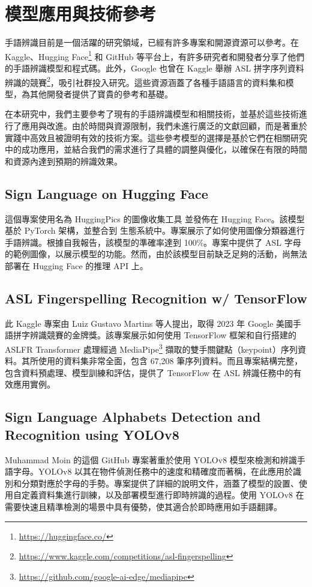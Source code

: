 \documentclass[conference]{IEEEtran}
\begin{document}
\section{模型應用與技術參考}

手語辨識目前是一個活躍的研究領域，已經有許多專案和開源資源可以參考。在 Kaggle、Hugging Face\footnote{\url{https://huggingface.co/}} 和 GitHub 等平台上，有許多研究者和開發者分享了他們的手語辨識模型和程式碼。此外，Google 也曾在 Kaggle 舉辦 ASL 拼字序列資料辨識的競賽\footnote{\url{https://www.kaggle.com/competitions/asl-fingerspelling}}，吸引社群投入研究。這些資源涵蓋了各種手語語言的資料集和模型，為其他開發者提供了寶貴的參考和基礎。

在本研究中，我們主要參考了現有的手語辨識模型和相關技術，並基於這些技術進行了應用與改進。由於時間與資源限制，我們未進行廣泛的文獻回顧，而是著重於實踐中高效且被證明有效的技術方案。這些參考模型的選擇是基於它們在相關研究中的成功應用，並結合我們的需求進行了具體的調整與優化，以確保在有限的時間和資源內達到預期的辨識效果。

\subsection{Sign Language on Hugging Face}
這個專案使用名為 HuggingPics 的圖像收集工具 \cite{ravenonur2024sign, nate2021hugging} 並發佈在 Hugging Face。該模型基於 PyTorch 架構，並整合到  生態系統中。專案展示了如何使用圖像分類器進行手語辨識。根據自我報告，該模型的準確率達到 100\%。專案中提供了 ASL 字母的範例圖像，以展示模型的功能。然而，由於該模型目前缺乏足夠的活動，尚無法部署在 Hugging Face 的推理 API 上。

\subsection{ASL Fingerspelling Recognition w/ TensorFlow}
此 Kaggle 專案由 Luiz Gustavo Martins 等人提出，取得 2023 年 Google 美國手語拼字辨識競賽的金牌獎。該專案展示如何使用 TensorFlow 框架和自行搭建的 ASLFR Transformer 處理經過 MediaPipe\footnote{\url{https://github.com/google-ai-edge/mediapipe}} 擷取的雙手關鍵點（keypoint）序列資料\cite{gusthema2024asl}。其所使用的資料集非常全面，包含 67,208 筆序列資料。而且專案結構完整，包含資料預處理、模型訓練和評估，提供了 TensorFlow 在 ASL 辨識任務中的有效應用實例。

\subsection{Sign Language Alphabets Detection and Recognition using YOLOv8}
Muhammad Moin 的這個 GitHub 專案著重於使用 YOLOv8 模型來檢測和辨識手語字母\cite{muhammadmoinfaisal2024sign}。YOLOv8 以其在物件偵測任務中的速度和精確度而著稱，在此應用於識別和分類對應於字母的手勢。專案提供了詳細的說明文件，涵蓋了模型的設置、使用自定義資料集進行訓練，以及部署模型進行即時辨識的過程。使用 YOLOv8 在需要快速且精準檢測的場景中具有優勢，使其適合於即時應用如手語翻譯。
\end{document}
